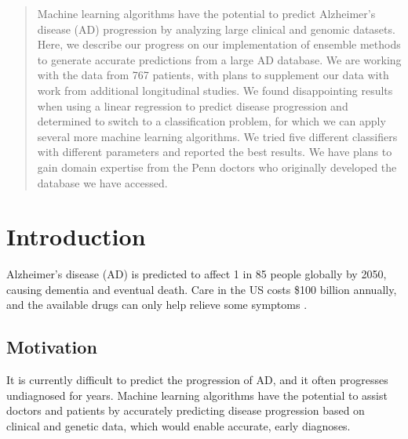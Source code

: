 \documentclass{article}
\begin{document}
 


\begin{abstract} 
Machine learning algorithms have the potential to predict Alzheimer's disease (AD) progression by analyzing large clinical and genomic datasets. Here, we describe our progress on our implementation of ensemble methods to generate accurate predictions from a large AD database. We are working with the data from 767 patients, with plans to supplement our data with work from additional longitudinal studies.  We found disappointing results when using a linear regression to predict disease progression and determined to switch to a classification problem, for which we can apply several more machine learning algorithms. We tried five different classifiers with different parameters and reported the best results. We have plans to gain domain expertise from the Penn doctors who originally developed the database we have accessed.
\end{abstract} 


\section{Introduction}
Alzheimer's disease (AD) is predicted to affect 1 in 85 people globally by 2050, causing dementia and eventual death. Care in the US costs \$100 billion annually, and the available drugs can only help relieve some symptoms \cite{duthey13}.

\subsection{Motivation}
It is currently difficult to predict the progression of AD, and it often progresses undiagnosed for years. Machine learning algorithms have the potential to assist doctors and patients by accurately predicting disease progression based on clinical and genetic data, which would enable accurate, early diagnoses.
\end{document}

